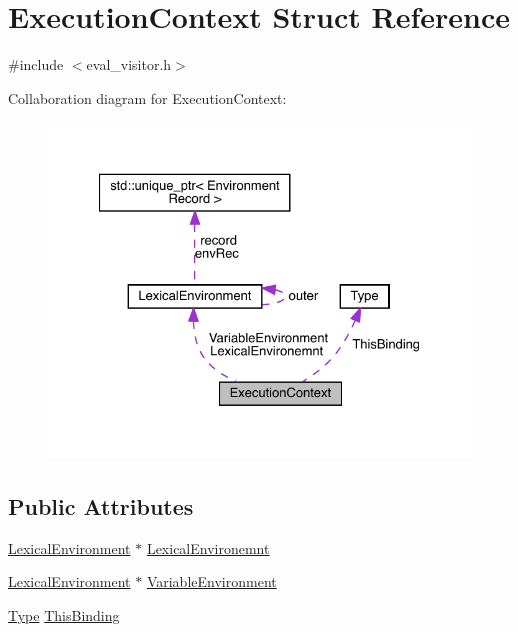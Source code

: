 \hypertarget{struct_execution_context}{}\section{Execution\+Context Struct Reference}
\label{struct_execution_context}


{\ttfamily \#include $<$eval\+\_\+visitor.\+h$>$}



Collaboration diagram for Execution\+Context\+:
\nopagebreak
\begin{figure}[H]
\begin{center}
\leavevmode
\includegraphics[width=327pt]{struct_execution_context__coll__graph}
\end{center}
\end{figure}
\subsection*{Public Attributes}
\begin{DoxyCompactItemize}
\item 
\hyperlink{struct_lexical_environment}{Lexical\+Environment} $\ast$ \hyperlink{struct_execution_context_a4bfa79ff6d0da2ad14d276f8d03ad0c5}{Lexical\+Environemnt}
\item 
\hyperlink{struct_lexical_environment}{Lexical\+Environment} $\ast$ \hyperlink{struct_execution_context_a20e7f3f3eed2842a3208faeb1b8ea6f5}{Variable\+Environment}
\item 
\hyperlink{class_type}{Type} \hyperlink{struct_execution_context_a748216918b628fd74beb4f9ec11ca8e8}{This\+Binding}
\end{DoxyCompactItemize}


